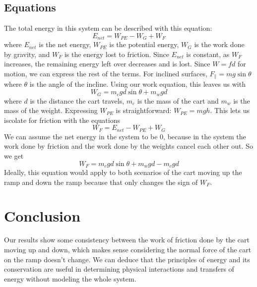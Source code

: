 \documentclass[12pt]{article}
\begin{document}
        \subsection{Equations}
            The total energy in this system can be described with this equation:
            \begin{equation}
                E_{net} = W_{PE} - W_G + W_F
            \end{equation}
            where $E_{net}$ is the net energy, $W_{PE}$ is the potential energy,
            $W_G$ is the work done by gravity, and $W_F$ is the energy lost to
            friction. Since $E_{net}$ is constant, as $W_F$ increases, the 
            remaining energy left over decreases and is lost. Since $W = fd$
            for motion, we can express the rest of the terms. For inclined
            surfaces, $F_{\parallel}  = mg\sin{\theta}$ where $\theta$ is the
            angle of the incline. Using our work equation, this leaves us with
            \begin{equation}
                W_G = m_cgd\sin{\theta} + m_wgd
            \end{equation}
            where $d$ is the distance the cart travels, $m_c$ is the mass of
            the cart and $m_w$ is the mass of the weight. Expressing $W_{PE}$ is
            straightforward: $W_{PE} = mgh$. This lets us iscolate for friction
            with the equations
            \begin{equation}
                W_F = E_{net} - W_{PE} + W_G
            \end{equation}
            We can assume the net energy in the system to be 0, because in the
            system the work done by friction and the work done by the weights
            cancel each other out. So we get
            \begin{equation}
                W_F = m_cgd\sin{\theta} + m_wgd - m_cgd
            \end{equation}
            Ideally, this equation would apply to both scenarios of the cart
            moving up the ramp and down the ramp because that only changes
            the sign of $W_F$.

    \section{Conclusion}
        Our results show some consistency between the work of friction done by
        the cart moving up and down, which makes sense considering the normal
        force of the cart on the ramp doesn't change. We can deduce that the
        principles of energy and its conservation are useful in determining
        physical interactions and transfers of energy without modeling the
        whole system.
\end{document}
